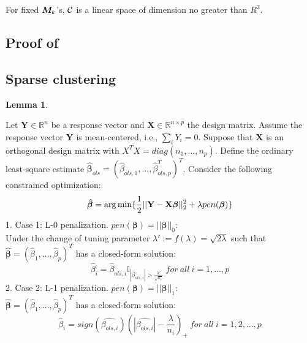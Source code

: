 \documentclass{article}
\newtheorem{lemma}{Lemma}
\begin{document}
\begin{appendices}
For fixed $\bm M_k$'s, $\mathcal{C}$ is a linear space of dimension no greater than $R^2$. 

\subsection{Proof of}

\subsection{Sparse clustering}
\begin{lemma}\label{lem:sparse}
\end{lemma}

Let $\mathbf{Y} \in \mathbb{R}^n$ be a response vector and $\mathbf{X} \in \mathbb{R}^{n\times p}$ the design matrix. Assume the response vector $\mathbf{Y}$ is mean-centered, i.e., $\sum_iY_i=0$. Suppose that $\mathbf{X}$ is an orthogonal design matrix with $X^TX=diag(n_1,...,n_p)$. Define the ordinary least-square estimate $\hat{\bm{\beta}}_{ols} = (\hat{\beta}_{ols,1},...,\hat{\beta}^T_{ols,p})^T$. Consider the following constrained optimization: 
\begin{equation*}
\bm{\hat{\beta}} = \operatorname*{arg\,min}\{\frac{1}{2}||\mathbf{Y}-\mathbf{X}\bm{\beta}||^2_2+\lambda pen(\bm{\beta})\}
\end{equation*}
1. Case 1: L-0 penalization. $pen(\bm{\beta}) = ||\bm{\beta}||_0$:\\
Under the change of tuning parameter $\lambda' := f(\lambda)=\sqrt{2\lambda}$  such that $\bm{\hat{\beta}} = (\hat{\beta}_1,..., \hat{\beta}_p)^T$ has a closed-form solution:
\begin{equation*}
\hat{\beta}_i = \hat{\beta}_{ols,i}\mathbb{I}_{|\hat{\beta}_{ols,i}|>\frac{\lambda'}{\sqrt{n_i}}}\ for\ all\ i=1,...,p
\end{equation*}
2. Case 2: L-1 penalization. $pen(\bm{\beta})= ||\bm{\beta}||_1$:\\
$\bm{\hat{\beta}} = (\hat{\beta}_1,..., \hat{\beta}_p)^T$ has a closed-form solution:
\begin{equation*}
\hat{\beta}_i = sign(\hat{\beta_{ols,i}})(|\hat{\beta_{ols,i}}|-\frac{\lambda}{n_i})_+\ for\ all\ i=1,2,...,p
\end{equation*}
		


\end{appendices}
\end{document}

